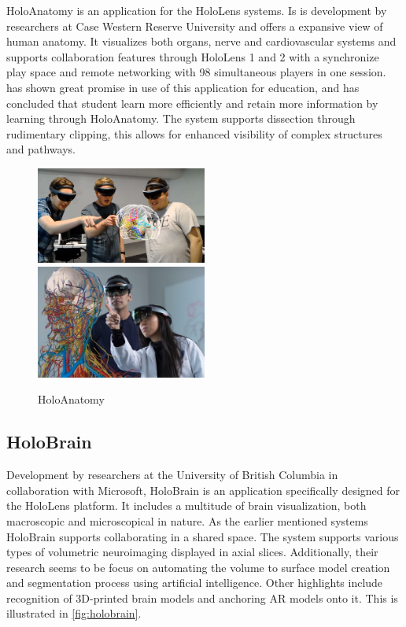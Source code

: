 HoloAnatomy is an application for the HoloLens systems. Is is development by researchers at Case Western Reserve University and offers a expansive view of human anatomy. It visualizes both organs, nerve and cardiovascular systems and supports collaboration features through HoloLens 1 and 2 with a synchronize play space and remote networking with 98 simultaneous players in one session. \citet{Wish2020} has shown great promise in use of this application for education, and has concluded that student learn more efficiently and retain more information by learning through HoloAnatomy. The system supports dissection through rudimentary clipping, this allows for enhanced visibility of complex structures and pathways.

\begin{figure}[H]
    \includegraphics[width=0.5\textwidth]{fig/holoanatomy1}
    \includegraphics[trim={0 1.76cm 0 0},clip,width=0.5\textwidth]{fig/holoanatomy2}
    \caption{HoloAnatomy}
\end{figure}


\subsection*{HoloBrain}
Development by researchers at the University of British Columbia in collaboration with Microsoft, HoloBrain is an application specifically designed for the HoloLens platform. It includes a multitude of brain visualization, both macroscopic and microscopical in nature. As the earlier mentioned systems HoloBrain supports collaborating in a shared space. The system supports various types of volumetric neuroimaging displayed in axial slices. Additionally, their research seems to be focus on automating the volume to surface model creation and segmentation process using artificial intelligence. Other highlights include recognition of 3D-printed brain models and anchoring AR models onto it. This is illustrated in \autoref{fig:holobrain}.

